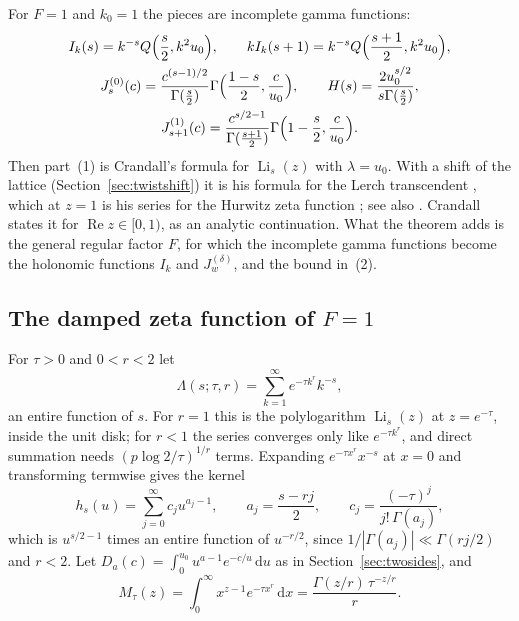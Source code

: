 \documentclass[11pt,reqno]{amsart}
\theoremstyle{definition}
\theoremstyle{remark}
\newcommand{\Li}{\operatorname{Li}}
\newcommand{\dd}{\,\mathrm{d}}
\begin{document}
For $F = 1$ and $k_0 = 1$ the pieces are incomplete gamma functions:
\begin{gather*}
  I_k(s) = k^{-s}Q\Bigl(\frac s2,k^2u_0\Bigr), \qquad kI_k(s+1) = k^{-s}Q\Bigl(\frac{s+1}2,k^2u_0\Bigr), \\
  J^{(0)}_s(c) = \frac{c^{(s-1)/2}}{\Gamma(\frac s2)}\Gamma\Bigl(\frac{1-s}2,\frac c{u_0}\Bigr), \qquad
  H(s) = \frac{2u_0^{s/2}}{s\Gamma(\frac s2)}, \\
  J^{(1)}_{s+1}(c) = \frac{c^{s/2-1}}{\Gamma(\frac{s+1}2)}\Gamma\Bigl(1-\frac s2,\frac c{u_0}\Bigr).
\end{gather*}
Then part~(1) is Crandall's formula for $\Li_s(z)$ \cite[(34)]{Cra12} with $\lambda = u_0$. With a shift of the lattice
(Section~\ref{sec:twistshift}) it is his formula for the Lerch transcendent \cite[(14)]{Cra12}, which at $z = 1$ is
his series for the Hurwitz zeta function \cite[(30)]{Cra12}; see also \cite{BB15}. Crandall states it for
$\operatorname{Re}z \in [0,1)$, as an analytic continuation. What the theorem adds is the general regular factor $F$,
for which the incomplete gamma functions become the holonomic functions $I_k$ and $J^{(\delta)}_w$, and the bound
in~(2).

\subsection{The damped zeta function of $F = 1$}\label{sec:stretched}
For $\tau > 0$ and $0 < r < 2$ let
\[
  \Lambda(s;\tau,r) = \sum_{k=1}^{\infty}e^{-\tau k^r}k^{-s},
\]
an entire function of $s$. For $r = 1$ this is the polylogarithm $\Li_s(z)$ at $z = e^{-\tau}$, inside the unit disk;
for $r < 1$ the series converges only like $e^{-\tau k^r}$, and direct summation needs $(p\log2/\tau)^{1/r}$
terms. Expanding $e^{-\tau x^r}x^{-s}$ at $x = 0$ and transforming termwise gives the kernel
\[
  h_s(u) = \sum_{j=0}^{\infty}c_ju^{a_j-1}, \qquad a_j = \frac{s - rj}{2}, \qquad c_j = \frac{(-\tau)^j}{j!\,\Gamma(a_j)},
\]
which is $u^{s/2-1}$ times an entire function of $u^{-r/2}$, since $1/|\Gamma(a_j)| \ll \Gamma(rj/2)$ and $r < 2$. Let
$D_a(c) = \int_0^{u_0}u^{a-1}e^{-c/u}\dd u$ as in Section~\ref{sec:twosides}, and
\[
  M_\tau(z) = \int_0^\infty x^{z-1}e^{-\tau x^r}\dd x = \frac{\Gamma(z/r)\,\tau^{-z/r}}{r}.
\]
\end{document}
